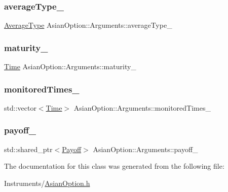 \subsubsection{\texorpdfstring{average\+Type\+\_\+}{averageType\_}}
{\footnotesize\ttfamily \hyperlink{class_asian_option_add7292791bf85820ff9fdbfd4407f3b9}{Average\+Type} Asian\+Option\+::\+Arguments\+::average\+Type\+\_\+}

\hypertarget{class_asian_option_1_1_arguments_ad39a2dee07ec9ec77cb64cb75e44a056}{}\label{class_asian_option_1_1_arguments_ad39a2dee07ec9ec77cb64cb75e44a056} 
\subsubsection{\texorpdfstring{maturity\+\_\+}{maturity\_}}
{\footnotesize\ttfamily \hyperlink{_name_def_8h_ac2d3e0ba793497bcca555c7c2cf64ff3}{Time} Asian\+Option\+::\+Arguments\+::maturity\+\_\+}

\hypertarget{class_asian_option_1_1_arguments_a27e013476613aec57076742ba561a722}{}\label{class_asian_option_1_1_arguments_a27e013476613aec57076742ba561a722} 
\subsubsection{\texorpdfstring{monitored\+Times\+\_\+}{monitoredTimes\_}}
{\footnotesize\ttfamily std\+::vector$<$\hyperlink{_name_def_8h_ac2d3e0ba793497bcca555c7c2cf64ff3}{Time}$>$ Asian\+Option\+::\+Arguments\+::monitored\+Times\+\_\+}

\hypertarget{class_asian_option_1_1_arguments_ae44f022e21c05aa688d1d94a0f57d125}{}\label{class_asian_option_1_1_arguments_ae44f022e21c05aa688d1d94a0f57d125} 
\subsubsection{\texorpdfstring{payoff\+\_\+}{payoff\_}}
{\footnotesize\ttfamily std\+::shared\+\_\+ptr$<$\hyperlink{class_payoff}{Payoff}$>$ Asian\+Option\+::\+Arguments\+::payoff\+\_\+}



The documentation for this class was generated from the following file\+:\begin{DoxyCompactItemize}
\item 
Instruments/\hyperlink{_asian_option_8h}{Asian\+Option.\+h}\end{DoxyCompactItemize}
